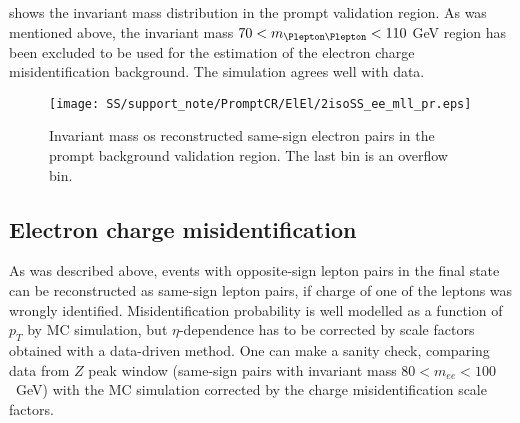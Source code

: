 \begin{table*}[htbp]
\begin{center}
\end{center}
\caption{Ratio between observed and expected same-sign pairs in the $WZ$ and $ZZ$ control region for various cuts on the dielectron invariant mass. 
The uncertainties account for both statistical and systematic errors.}
\label{tab:prompt_ratios}
\end{table*}

 shows the invariant mass distribution in the prompt validation region. As was mentioned above, 
the invariant mass $70 < m_{\Plepton\Plepton}< 110$ GeV region has been excluded
to be used for the estimation of the electron charge misidentification background.
The simulation agrees well with data.

\begin{figure}[h]
\begin{center}
\texttt{[image: SS/support\_note/PromptCR/ElEl/2isoSS\_ee\_mll\_pr.eps]}
\caption{Invariant mass os reconstructed same-sign electron pairs in the prompt background validation region. The last bin is an overflow bin.}
\label{fig:prompt_CR}
\end{center}
\end{figure} 


\subsection{Electron charge misidentification}

As was described above, events with opposite-sign lepton pairs in the final state can be reconstructed as same-sign lepton pairs, 
if charge of one of the leptons was wrongly identified.
Misidentification probability is well modelled as a function of $p_T$ by MC simulation, 
but $\eta$-dependence has to be corrected by scale factors obtained with a data-driven method.
One can make a sanity check, comparing data from $Z$ peak window (same-sign pairs with invariant mass $80 < m_{ee} < 100$~GeV)
with the MC simulation corrected by the charge misidentification scale factors.

